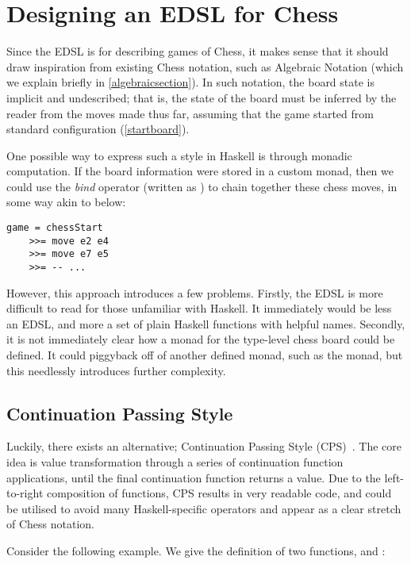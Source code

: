 \section{Designing an EDSL for Chess}

Since the EDSL is for describing games of Chess, it makes sense that it should draw inspiration from existing Chess notation, such as Algebraic Notation (which we explain briefly in \cref{algebraicsection}). In such notation, the board state is implicit and undescribed; that is, the state of the board must be inferred by the reader from the moves made thus far, assuming that the game started from standard configuration (\cref{startboard}).

One possible way to express such a style in Haskell is through monadic computation. If the board information were stored in a custom monad, then we could use the \emph{bind} operator (written as \inline{(>>=)}) to chain together these chess moves, in some way akin to below:

\newpage %

\begin{lstlisting}
game = chessStart
    >>= move e2 e4
    >>= move e7 e5
    >>= -- ...
\end{lstlisting}

However, this approach introduces a few problems. Firstly, the EDSL is more difficult to read for those unfamiliar with Haskell. It immediately would be less an EDSL, and more a set of plain Haskell functions with helpful names. Secondly, it is not immediately clear how a monad for the type-level chess board could be defined. It could piggyback off of another defined monad, such as the  monad, but this needlessly introduces further complexity.

\subsection{Continuation Passing Style} \label{cpsshortexample}

Luckily, there exists an alternative; Continuation Passing Style (CPS)~\cite{cps}. The core idea is value transformation through a series of continuation function applications, until the final continuation function returns a value. Due to the left-to-right composition of functions, CPS results in very readable code, and could be utilised to avoid many Haskell-specific operators and appear as a clear stretch of Chess notation.

Consider the following example. We give the definition of two functions,  and :

